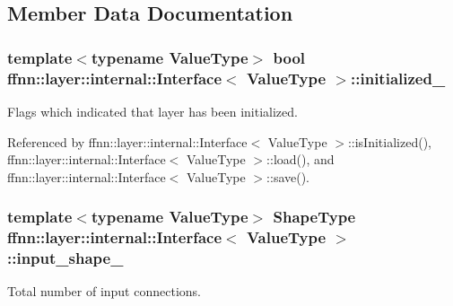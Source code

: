 \subsection{Member Data Documentation}
\hypertarget{classffnn_1_1layer_1_1internal_1_1_interface_a48c80e6608e9e20dfe2665abd55cd7ba}{
\subsubsection[{initialized\-\_\-}]{\setlength{\rightskip}{0pt plus 5cm}template$<$typename Value\-Type$>$ bool {\bf ffnn\-::layer\-::internal\-::\-Interface}$<$ Value\-Type $>$\-::initialized\-\_\-\hspace{0.3cm}{\ttfamily [protected]}}}\label{classffnn_1_1layer_1_1internal_1_1_interface_a48c80e6608e9e20dfe2665abd55cd7ba}


Flags which indicated that layer has been initialized. 



Referenced by ffnn\-::layer\-::internal\-::\-Interface$<$ Value\-Type $>$\-::is\-Initialized(), ffnn\-::layer\-::internal\-::\-Interface$<$ Value\-Type $>$\-::load(), and ffnn\-::layer\-::internal\-::\-Interface$<$ Value\-Type $>$\-::save().

\hypertarget{classffnn_1_1layer_1_1internal_1_1_interface_a3b9f183881a6aed198c566ecbf0177f7}{
\subsubsection[{input\-\_\-shape\-\_\-}]{\setlength{\rightskip}{0pt plus 5cm}template$<$typename Value\-Type$>$ {\bf Shape\-Type} {\bf ffnn\-::layer\-::internal\-::\-Interface}$<$ Value\-Type $>$\-::input\-\_\-shape\-\_\-\hspace{0.3cm}{\ttfamily [protected]}}}\label{classffnn_1_1layer_1_1internal_1_1_interface_a3b9f183881a6aed198c566ecbf0177f7}


Total number of input connections. 



